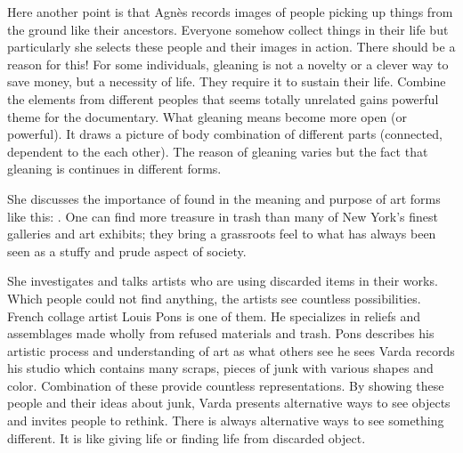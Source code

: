 Here another point is that Agnès records images of people picking up things from the ground like their ancestors. Everyone somehow collect things in their life but particularly she selects these people and their images in action. There should be a reason for this! For some individuals, gleaning is not a novelty or a clever way to save money, but a necessity of life. They require it to sustain their life. Combine the elements from different peoples that seems totally unrelated gains powerful theme for the documentary. What gleaning means become more open (or powerful). It draws a picture of body combination of different parts (connected, dependent to the each other). The reason of gleaning varies but the fact that gleaning is continues in different forms.

She discusses the importance of found in the meaning and purpose of art forms like this:  \cite{cruickshank2007work}. One can find more treasure in trash than many of New York’s finest galleries and art exhibits; they bring a grassroots feel to what has always been seen as a stuffy and prude aspect of society.

She investigates and talks artists who are using discarded items in their works. Which people could not find anything, the artists see countless possibilities. French collage artist Louis Pons is one of them. He specializes in reliefs and assemblages made wholly from refused materials and trash. Pons describes his artistic process and understanding of art as what others see  he sees  Varda records his studio which contains many scraps, pieces of junk with various shapes and color. Combination of these provide countless representations. By showing these people and their ideas about junk, Varda presents alternative ways to see objects and invites people to rethink. There is always alternative ways to see something different. It is like giving life or finding life from discarded object.
